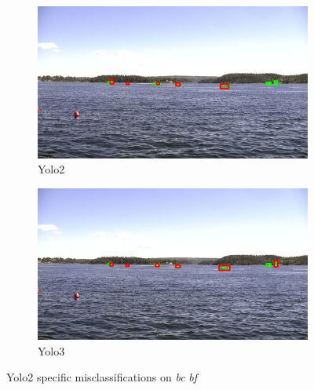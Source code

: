 \begin{figure}[h!]
\begin{subfigure}{.5\textwidth}
  \centering
  \includegraphics[width=0.9\linewidth]{results/case_buildings/yolo23/3better/yolo2/selected_06_25_frame0057.jpg}
  \caption{Yolo2}
\end{subfigure}%
\begin{subfigure}{.5\textwidth}
  \centering
  \includegraphics[width=.9\linewidth]{results/case_buildings/yolo23/3better/yolo3/selected_06_25_frame0057.jpg}
  \caption{Yolo3}
\end{subfigure}
\caption{Yolo2 specific misclassifications on \textit{bc} \textit{bf}}
\label{img:yolo2_misclas}


\end{figure}
